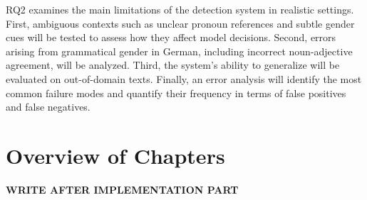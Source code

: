     RQ2 examines the main limitations of the detection system in realistic settings. First, ambiguous contexts such as unclear pronoun references and subtle gender cues will be tested to assess how they affect model decisions. Second, errors arising from grammatical gender in German, including incorrect noun-adjective agreement, will be analyzed. Third, the system’s ability to generalize will be evaluated on out-of-domain texts. Finally, an error analysis will identify the most common failure modes and quantify their frequency in terms of false positives and false negatives.

\section{Overview of Chapters}
\textbf{WRITE AFTER IMPLEMENTATION PART}
